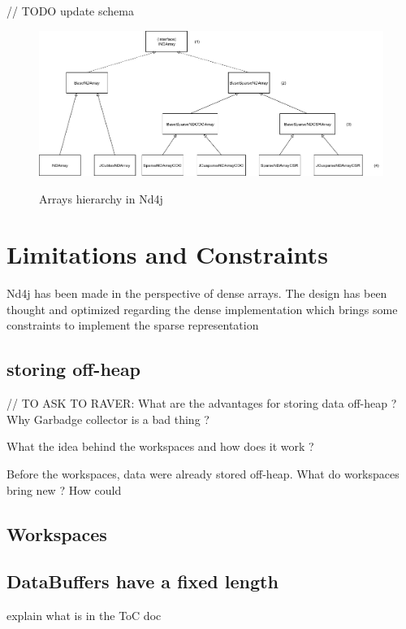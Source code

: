 // TODO update schema
 
\begin{figure}[H]
	\begin{center}
		\includegraphics[width=6.5in]{images/INDArrayHierarchy.png} 
		\label{fig:hierarchy}
		\caption{Arrays hierarchy in Nd4j}
	\end{center}
\end{figure}


\section{Limitations and Constraints}

Nd4j has been made in the perspective of dense arrays. The design has been thought and optimized regarding the dense implementation which brings some constraints to implement the sparse representation
\subsection{storing off-heap}

// TO ASK TO RAVER:
What are the advantages for storing data off-heap ? Why Garbadge collector is a bad thing ?

What the idea behind the workspaces and how does it work ?

Before the workspaces, data were already stored off-heap. What do workspaces bring new ? How could 



\subsection{Workspaces}
\subsection{DataBuffers have a fixed length}

explain what is in the ToC doc

